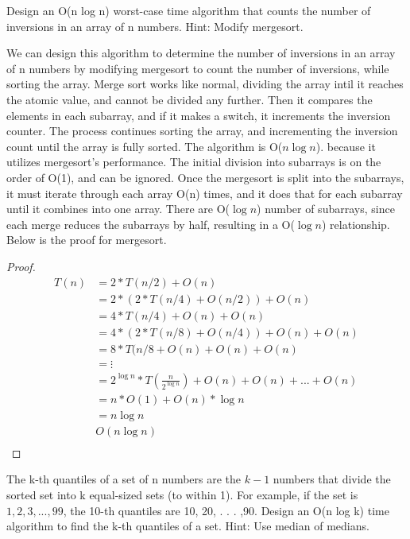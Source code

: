 \documentclass[10pt]{article}
\newenvironment{exercise}[2][Exercise]{\begin{trivlist}
\item[\hskip \labelsep {\bfseries #1}\hskip \labelsep {\bfseries #2.}]}{\end{trivlist}}
\newenvironment{solution}[2][Solution]{\begin{trivlist}
\item[\hskip \labelsep {\bfseries #1}\hskip \labelsep {\bfseries #2.}]}{\end{trivlist}}
\theoremstyle{definition}
\begin{document}
\begin{exercise}{(4)} %
Design an O(n log n) worst-case time algorithm that counts the number of inversions in an array of n numbers. Hint: Modify mergesort.
\end{exercise}

\begin{solution}{(4)}
We can design this algorithm to determine the number of inversions in an array of n numbers by modifying mergesort to count the number of inversions, while sorting the array. Merge sort works like normal, dividing the array intil it reaches the atomic value, and cannot be divided any further. Then it compares the elements in each subarray, and if it makes a switch, it increments the inversion counter. The process continues sorting the array, and incrementing the inversion count until the array is fully sorted. The algorithm is O($n\log{n}$). because it utilizes mergesort's performance. The initial division into subarrays is on the order of O(1), and can be ignored. Once the mergesort is split into the subarrays, it must iterate through each array O(n) times, and it does that for each subarray until it combines into one array. There are O($\log{n}$) number of subarrays, since each merge reduces the subarrays by half, resulting in a O($\log{n}$) relationship. Below is the proof for mergesort.
\begin{proof}
\begin{align*}
T(n) & = 2 * T(n/2) + O(n)\\
& = 2 * (2 * T(n/4) + O(n/2)) + O(n)\\
& = 4 * T(n/4) + O(n) + O(n)\\
& = 4 * (2 * T(n/8) + O(n/4)) + O(n) + O(n)\\
& = 8 * T(n/8 + O(n) + O(n) + O(n)\\
& = \vdots\\
& = 2^{\log{n}} * T(\frac{n}{2^{\log{n}}}) + O(n) + O(n) + ... + O(n)\\
& = n * O(1) + O(n) * \log{n}\\
& = n \log{n}\\
& O(n\log{n})\\
\end{align*}
\end{proof}
\end{solution}

\begin{exercise}{(5)} %
The k-th quantiles of a set of n numbers are the $k−1$ numbers that divide the sorted set into k equal-sized sets (to within 1). For example, if the set is ${1, 2, 3, . . . , 99}$, the 10-th quantiles are 10, 20, . . . ,90. Design an O(n log k) time algorithm to find the k-th quantiles of a set. Hint: Use median of medians.
\end{exercise}
\end{document}
